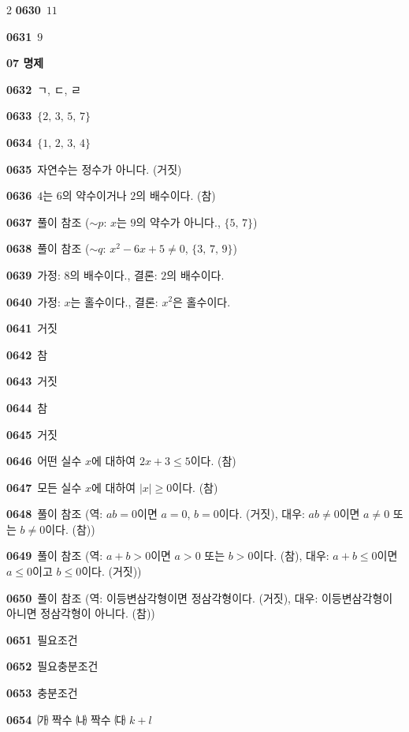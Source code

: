 \documentclass[10pt,a4paper]{article}
\begin{document}
\begin{multicols}{2}
\noindent\textbf{0630}\ $11$\par
\noindent\textbf{0631}\ $9$\par
\noindent\textbf{07 명제}\par\smallskip
\noindent\textbf{0632}\ ㄱ, ㄷ, ㄹ\par
\noindent\textbf{0633}\ $\{2,\,3,\,5,\,7\}$\par
\noindent\textbf{0634}\ $\{1,\,2,\,3,\,4\}$\par
\noindent\textbf{0635}\ 자연수는 정수가 아니다. (거짓)\par
\noindent\textbf{0636}\ $4$는 $6$의 약수이거나 $2$의 배수이다. (참)\par
\noindent\textbf{0637}\ 풀이 참조 ($\sim p$: $x$는 $9$의 약수가 아니다., $\{5,\,7\}$)\par
\noindent\textbf{0638}\ 풀이 참조 ($\sim q$: $x^2-6x+5\ne 0$, $\{3,\,7,\,9\}$)\par
\noindent\textbf{0639}\ 가정: $8$의 배수이다., 결론: $2$의 배수이다.\par
\noindent\textbf{0640}\ 가정: $x$는 홀수이다., 결론: $x^2$은 홀수이다.\par
\noindent\textbf{0641}\ 거짓\par
\noindent\textbf{0642}\ 참\par
\noindent\textbf{0643}\ 거짓\par
\noindent\textbf{0644}\ 참\par
\noindent\textbf{0645}\ 거짓\par
\noindent\textbf{0646}\ 어떤 실수 $x$에 대하여 $2x+3\le 5$이다. (참)\par
\noindent\textbf{0647}\ 모든 실수 $x$에 대하여 $|x|\ge 0$이다. (참)\par
\noindent\textbf{0648}\ 풀이 참조 (역: $ab=0$이면 $a=0$, $b=0$이다. (거짓), 대우: $ab\ne 0$이면 $a\ne 0$ 또는 $b\ne 0$이다. (참))\par
\noindent\textbf{0649}\ 풀이 참조 (역: $a+b>0$이면 $a>0$ 또는 $b>0$이다. (참), 대우: $a+b\le 0$이면 $a\le 0$이고 $b\le 0$이다. (거짓))\par
\noindent\textbf{0650}\ 풀이 참조 (역: 이등변삼각형이면 정삼각형이다. (거짓), 대우: 이등변삼각형이 아니면 정삼각형이 아니다. (참))\par
\noindent\textbf{0651}\ 필요조건\par
\noindent\textbf{0652}\ 필요충분조건\par
\noindent\textbf{0653}\ 충분조건\par
\noindent\textbf{0654}\ ㈎ 짝수 \quad ㈏ 짝수 \quad ㈐ $k+l$\par

\end{multicols}
\end{document}
